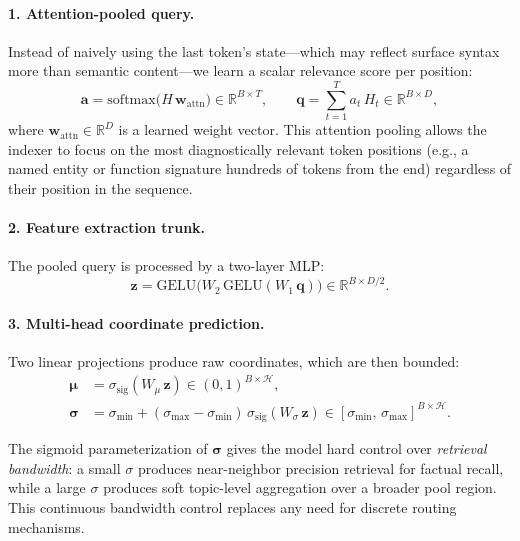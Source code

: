 \documentclass[11pt]{article}
\begin{document}
\paragraph{1. Attention-pooled query.}
Instead of naively using the last token's state—which may reflect surface
syntax more than semantic content—we learn a scalar relevance score per position:
\begin{equation}
  \mathbf{a} = \mathrm{softmax}\!\bigl(H\,\mathbf{w}_{\mathrm{attn}}\bigr)
  \in \mathbb{R}^{B \times T}, \qquad
  \mathbf{q} = \sum_{t=1}^T a_t \, H_t \in \mathbb{R}^{B \times D},
\end{equation}
where $\mathbf{w}_{\mathrm{attn}} \in \mathbb{R}^{D}$ is a learned weight
vector. This attention pooling allows the indexer to focus on the most
diagnostically relevant token positions
(e.g., a named entity or function signature hundreds of tokens from the end)
regardless of their position in the sequence.

\paragraph{2. Feature extraction trunk.}
The pooled query is processed by a two-layer MLP:
\begin{equation}
  \mathbf{z} = \mathrm{GELU}\!\bigl(W_2\,\mathrm{GELU}(W_1\,\mathbf{q})\bigr)
  \in \mathbb{R}^{B \times D/2}.
\end{equation}

\paragraph{3. Multi-head coordinate prediction.}
Two linear projections produce raw coordinates, which are then bounded:
\begin{align}
  \boldsymbol{\mu}    &= \sigma_{\mathrm{sig}}(W_\mu\, \mathbf{z})
    \in (0,1)^{B \times \mathcal{H}},\\
  \boldsymbol{\sigma} &= \sigma_{\min} + (\sigma_{\max} - \sigma_{\min})\,
    \sigma_{\mathrm{sig}}(W_\sigma\, \mathbf{z})
    \in [\sigma_{\min},\, \sigma_{\max}]^{B \times \mathcal{H}}.
\end{align}

The sigmoid parameterization of $\boldsymbol{\sigma}$ gives the model hard
control over \emph{retrieval bandwidth}: a small $\sigma$ produces
near-neighbor precision retrieval for factual recall, while a large $\sigma$
produces soft topic-level aggregation over a broader pool region.
This continuous bandwidth control replaces any need for discrete routing
mechanisms.
\end{document}
